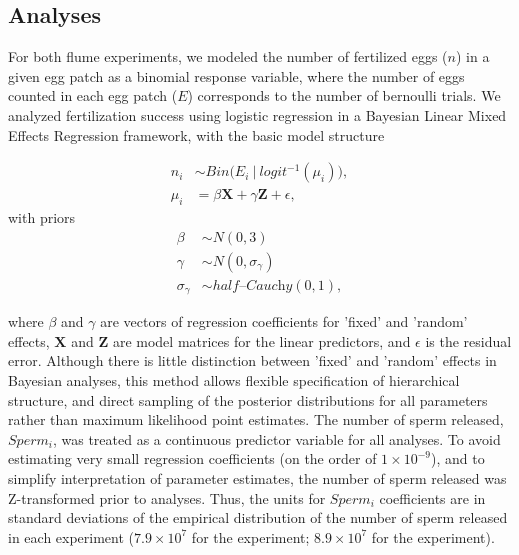 \documentclass{article}
\begin{document}
	\subsection*{Analyses}
	For both flume experiments, we modeled the number of fertilized eggs ($n$) in a given egg patch as a binomial response variable, where the number of eggs counted in each egg patch ($E$) corresponds to the number of bernoulli trials. We analyzed fertilization success using logistic regression in a Bayesian Linear Mixed Effects Regression framework, with the basic model structure 

\begin{align*}
	n_i   &\sim Bin\Big(E_i~|~logit^{-1}(\mu_i)\Big), \\
	\mu_i &= \beta \mathbf{X} + \gamma \mathbf{Z} + \epsilon,
\end{align*}
\noindent{} with priors
\begin{align*}
	\beta           &\sim N(0,3) \\
	\gamma          &\sim N(0,\sigma_{\gamma}) \\
	\sigma_{\gamma} &\sim \mathit{half} \text{--}\textit{Cauchy}(0,1),
\end{align*}

	\noindent where $\beta$ and $\gamma$ are vectors of regression coefficients for 'fixed' and 'random' effects, $\mathbf{X}$ and $\mathbf{Z}$ are model matrices for the linear predictors, and $\epsilon$ is the residual error. Although there is little distinction between 'fixed' and 'random' effects in Bayesian analyses, this method allows flexible specification of hierarchical structure, and direct sampling of the posterior distributions for all parameters rather than maximum likelihood point estimates. The number of sperm released, $Sperm_i$, was treated as a continuous predictor variable for all analyses. To avoid estimating very small regression coefficients (on the order of $1 \times 10^{-9}$), and to simplify interpretation of parameter estimates, the number of sperm released was Z-transformed prior to analyses. Thus, the units for $Sperm_i$ coefficients are in standard deviations of the empirical distribution of the number of sperm released in each experiment ($7.9 \times 10^{7}$ for the  experiment; $8.9 \times 10^{7}$ for the  experiment). 
\end{document}
